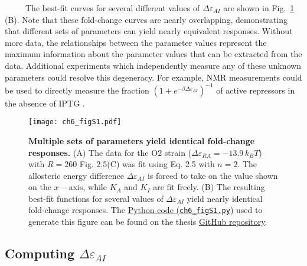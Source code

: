 \documentclass[12pt]{caltech_thesis}
\begin{document}
~~~~~The best-fit curves for several different values of
\(\Delta\varepsilon_{AI}\) are shown in Fig.~\ref{fig:degenerate_epai}
(B). Note that these fold-change curves are nearly overlapping,
demonstrating that different sets of parameters can yield nearly
equivalent responses. Without more data, the relationships between the
parameter values represent the maximum information about the parameter
values that can be extracted from the data. Additional experiments which
independently measure any of these unknown parameters could resolve this
degeneracy. For example, NMR measurements could be used to directly
measure the fraction \((1 + e^{-\beta \Delta\varepsilon_{AI}})^{-1}\) of
active repressors in the absence of IPTG
\autocite{gardino2003,boulton2016}.

\hypertarget{fig:degenerate_epai}{%
\begin{figure}
\centering
\texttt{[image: ch6\_figS1.pdf]}
\caption[{Multiple sets of parameters yield identical fold-change
responses.}]{\textbf{Multiple sets of parameters yield identical
fold-change responses.} (A) The data for the O2 strain
(\(\Delta\varepsilon_{RA}=-13.9\, k_BT\)) with \(R=260\) Fig. 2.5(C) was
fit using Eq. 2.5 with \(n=2\). The allosteric energy difference
\(\Delta\varepsilon_{AI}\) is forced to take on the value shown on the
\(x-\)axis, while \(K_A\) and \(K_I\) are fit freely. (B) The resulting
best-fit functions for several values of \(\Delta\varepsilon_{AI}\)
yield nearly identical fold-change responses. The
\href{https://github.com/gchure/phd/blob/master/src/chapter_06/code/ch6_figS1.py}{Python
code (\texttt{ch6\_figS1.py})} used to generate this figure can be found
on the thesis \href{https://github.com/gchure/phd}{GitHub repository}.}
\label{fig:degenerate_epai}
\end{figure}
}

\hypertarget{computing-deltavarepsilon_ai}{%
\subsection{\texorpdfstring{Computing
\(\Delta\varepsilon_{AI}\)}{Computing \textbackslash Delta\textbackslash varepsilon\_\{AI\}}}\label{computing-deltavarepsilon_ai}}
\end{document}
